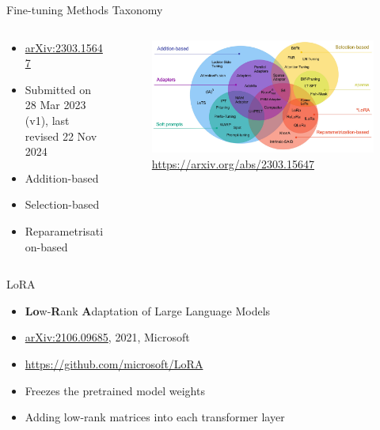 \documentclass[aspectratio=169]{beamer}
\begin{document}


\begin{frame}{Fine-tuning Methods Taxonomy}

  \begin{columns}
    \begin{column}{0.5\textwidth}
      \begin{itemize}
        \setlength\itemsep{1em}
        \item \href{https://arxiv.org/abs/2303.15647}{arXiv:2303.15647}
        \item Submitted on 28 Mar 2023 (v1), last revised 22 Nov 2024
        \item Addition-based
        \item Selection-based
        \item Reparametrisation-based
      \end{itemize}
    \end{column}
    \begin{column}{0.5\textwidth}
      \begin{figure}
        \includegraphics[width = \textwidth]{images/fine-tuning-methods-taxonomy.png}
        \caption{\footnotesize \url{https://arxiv.org/abs/2303.15647}}
      \end{figure}
    \end{column}
  \end{columns}

  
\end{frame}


\begin{frame}{LoRA}

  \begin{itemize}
    \setlength\itemsep{1em}
    \item \textbf{Lo}w-\textbf{R}ank \textbf{A}daptation of Large Language Models
    \item \href{https://arxiv.org/abs/2106.09685}{arXiv:2106.09685}, 2021, Microsoft
    \item \url{https://github.com/microsoft/LoRA}
    \item Freezes the pretrained model weights
    \item Adding low-rank matrices into each transformer layer
  \end{itemize}

\end{frame}
\end{document}
